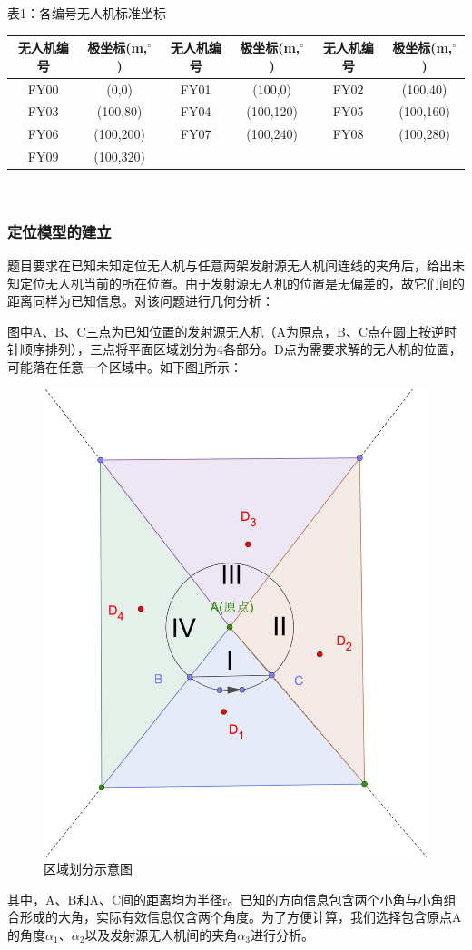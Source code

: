 \documentclass{ctexart}
\begin{document}
\begin{center}
  表1：各编号无人机标准坐标
  ~\\
    \begin{tabular}{|c|c|c|c|c|c|}
        \hline
        无人机编号&极坐标(m,$^{\circ}$)&无人机编号&极坐标(m,$^{\circ}$)&无人机编号&极坐标(m,$^{\circ}$)\\
        \hline
        FY00&(0,0)&FY01&(100,0)&FY02&(100,40)\\
        \hline
        FY03&(100,80)&FY04&(100,120)&FY05&(100,160)\\
        \hline
        FY06&(100,200)&FY07&(100,240)&FY08&(100,280)\\
        \hline
        FY09&(100,320)& & & &\\    

        \hline
    \end{tabular}\\
\end{center}
\subsubsection{定位模型的建立}
题目要求在已知未知定位无人机与任意两架发射源无人机间连线的夹角后，给出未知定位无人机当前的所在位置。由于发射源无人机的位置是无偏差的，故它们间的距离同样为已知信息。对该问题进行几何分析：

图中A、B、C三点为已知位置的发射源无人机（A为原点，B、C点在圆上按逆时针顺序排列），三点将平面区域划分为4各部分。D点为需要求解的无人机的位置，可能落在任意一个区域中。如下图\ref{区域划分示意图}所示：

\begin{figure}[H]
  \centering
  \includegraphics[width=0.40\linewidth]{pic/quadrant(1).eps}
  \caption{区域划分示意图}
  \label{区域划分示意图}
  \end{figure} 


其中，A、B和A、C间的距离均为半径r。已知的方向信息包含两个小角与小角组合形成的大角，实际有效信息仅含两个角度。为了方便计算，我们选择包含原点A的角度$\alpha_1$、$\alpha_2$以及发射源无人机间的夹角$\alpha_3$进行分析。
\end{document}
